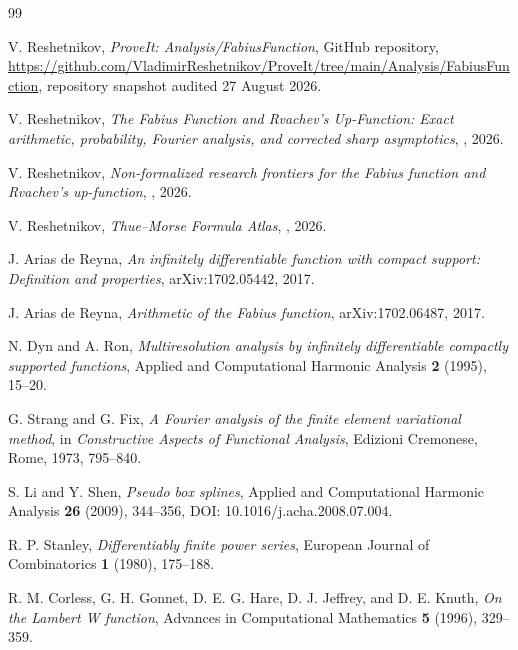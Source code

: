 \documentclass[11pt,oneside]{article}
\theoremstyle{definition}
\theoremstyle{remark}
\begin{document}
\begin{thebibliography}{99}

V. Reshetnikov,
\emph{ProveIt: Analysis/FabiusFunction}, GitHub repository,
\url{https://github.com/VladimirReshetnikov/ProveIt/tree/main/Analysis/FabiusFunction},
repository snapshot audited 27 August 2026.

V. Reshetnikov,
\emph{The Fabius Function and Rvachev's Up-Function: Exact arithmetic, probability, Fourier analysis, and corrected sharp asymptotics},
, 2026.

V. Reshetnikov,
\emph{Non-formalized research frontiers for the Fabius function and Rvachev's up-function},
, 2026.

V. Reshetnikov,
\emph{Thue--Morse Formula Atlas},
, 2026.

J. Arias de Reyna,
\emph{An infinitely differentiable function with compact support: Definition and properties},
arXiv:1702.05442, 2017.

J. Arias de Reyna,
\emph{Arithmetic of the Fabius function},
arXiv:1702.06487, 2017.

N. Dyn and A. Ron,
\emph{Multiresolution analysis by infinitely differentiable compactly supported functions},
Applied and Computational Harmonic Analysis \textbf{2} (1995), 15--20.

G. Strang and G. Fix,
\emph{A Fourier analysis of the finite element variational method},
in \emph{Constructive Aspects of Functional Analysis}, Edizioni Cremonese, Rome, 1973, 795--840.

S. Li and Y. Shen,
\emph{Pseudo box splines},
Applied and Computational Harmonic Analysis \textbf{26} (2009), 344--356,
DOI: 10.1016/j.acha.2008.07.004.

R. P. Stanley,
\emph{Differentiably finite power series},
European Journal of Combinatorics \textbf{1} (1980), 175--188.

R. M. Corless, G. H. Gonnet, D. E. G. Hare, D. J. Jeffrey, and D. E. Knuth,
\emph{On the Lambert W function},
Advances in Computational Mathematics \textbf{5} (1996), 329--359.


\end{thebibliography}
\end{document}
